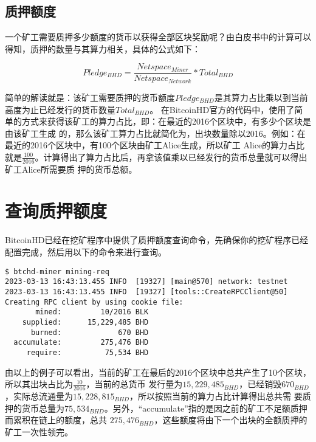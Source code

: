 \subsection{质押额度}
\begin{flushleft}
    一个矿工需要质押多少额度的货币以获得全部区块奖励呢？由白皮书中的计算可以得知，质押的数量与其算力相关，具体的公式如下：
\end{flushleft}
\begin{equation}
    Pledge_{BHD}=\frac{Netspace_{Miner}}{Netspace_{Network}}*Total_{BHD}
\end{equation}
\begin{flushleft}
    简单的解读就是：该矿工需要质押的货币额度$Pledge_{BHD}$是其算力占比乘以到当前高度为止已经发行的货币数量$Total_{BHD}$。
    在BitcoinHD官方的代码中，使用了简单的方式来获得该矿工的算力占比，即：在最近的2016个区块中，有多少个区块是由该矿工生成
    的，那么该矿工算力占比就简化为，出块数量除以2016。例如：在最近的2016个区块中，有100个区块由矿工Alice生成，所以矿工
    Alice的算力占比就是$\frac{100}{2016}$。计算得出了算力占比后，再拿该值乘以已经发行的货币总量就可以得出矿工Alice所需要质
    押的货币总额。
\end{flushleft}
\section{查询质押额度}
\begin{flushleft}
    BitcoinHD已经在挖矿程序中提供了质押额度查询命令，先确保你的挖矿程序已经配置完成，然后用以下的命令来进行查询。
\end{flushleft}
\scriptsize
\begin{verbatim}
$ btchd-miner mining-req
2023-03-13 16:43:13.455 INFO  [19327] [main@570] network: testnet
2023-03-13 16:43:13.455 INFO  [19327] [tools::CreateRPCClient@50] Creating RPC client by using cookie file:
       mined:         10/2016 BLK
    supplied:      15,229,485 BHD
      burned:             670 BHD
  accumulate:         275,476 BHD
     require:          75,534 BHD
\end{verbatim}
\normalsize
\begin{flushleft}
    由以上的例子可以看出，当前的矿工在最后的2016个区块中总共产生了10个区块，所以其出块占比为$\frac{10}{2016}$，当前的总货币
    发行量为$15,229,485_{BHD}$，已经销毁$670_{BHD}$，实际总流通量为$15,228,815_{BHD}$，所以按照当前的算力占比计算得出总共需
    要质押的货币总量为$75,534_{BHD}$。另外，``accumulate''指的是因之前的矿工不足额质押而累积在链上的额度，总共
    $275,476_{BHD}$，这些额度将由下一个出块的全额质押的矿工一次性领完。
\end{flushleft}
